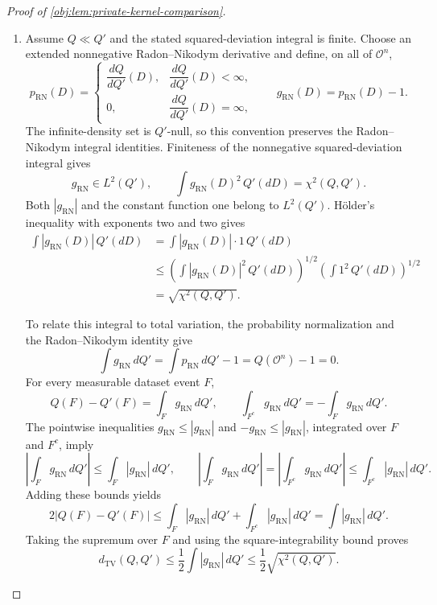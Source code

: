 \documentclass[11pt]{article}
\begin{document}
\begin{proof}[Proof of \cref{obj:lem:private-kernel-comparison}]
\begin{enumerate}
\item Assume \(Q\ll Q'\) and the stated squared-deviation integral is finite. Choose an extended nonnegative Radon--Nikodym derivative and define, on all of \(\mathcal O^n\),
\[
p_{\mathrm{RN}}(D)=
\begin{cases}
\dfrac{dQ}{dQ'}(D),&\dfrac{dQ}{dQ'}(D)<\infty,\\
0,&\dfrac{dQ}{dQ'}(D)=\infty,
\end{cases}
\qquad
g_{\mathrm{RN}}(D)=p_{\mathrm{RN}}(D)-1.
\]
The infinite-density set is \(Q'\)-null, so this convention preserves the Radon--Nikodym integral identities. Finiteness of the nonnegative squared-deviation integral gives
\[
g_{\mathrm{RN}}\in L^2(Q'),
\qquad
\int g_{\mathrm{RN}}(D)^2\,Q'(dD)=\chi^2(Q,Q').
\]
Both \(|g_{\mathrm{RN}}|\) and the constant function one belong to \(L^2(Q')\). Hölder's inequality with exponents two and two gives
\[
\begin{aligned}
\int|g_{\mathrm{RN}}(D)|\,Q'(dD)
&=\int|g_{\mathrm{RN}}(D)|\cdot1\,Q'(dD)\\
&\le
\left(\int|g_{\mathrm{RN}}(D)|^2\,Q'(dD)\right)^{1/2}
\left(\int1^2\,Q'(dD)\right)^{1/2}\\
&=\sqrt{\chi^2(Q,Q')}.
\end{aligned}
\]

To relate this integral to total variation, the probability normalization and the Radon--Nikodym identity give
\[
\int g_{\mathrm{RN}}\,dQ'
=
\int p_{\mathrm{RN}}\,dQ'-1
=Q(\mathcal O^n)-1=0.
\]
For every measurable dataset event \(F\),
\[
Q(F)-Q'(F)=\int_F g_{\mathrm{RN}}\,dQ',
\qquad
\int_{F^c}g_{\mathrm{RN}}\,dQ'
=-\int_F g_{\mathrm{RN}}\,dQ'.
\]
The pointwise inequalities
\(g_{\mathrm{RN}}\le|g_{\mathrm{RN}}|\) and
\(-g_{\mathrm{RN}}\le|g_{\mathrm{RN}}|\), integrated over \(F\) and \(F^c\), imply
\[
\left|\int_F g_{\mathrm{RN}}\,dQ'\right|
\le\int_F|g_{\mathrm{RN}}|\,dQ',
\qquad
\left|\int_F g_{\mathrm{RN}}\,dQ'\right|
=
\left|\int_{F^c}g_{\mathrm{RN}}\,dQ'\right|
\le\int_{F^c}|g_{\mathrm{RN}}|\,dQ'.
\]
Adding these bounds yields
\[
2|Q(F)-Q'(F)|
\le
\int_F|g_{\mathrm{RN}}|\,dQ'
+\int_{F^c}|g_{\mathrm{RN}}|\,dQ'
=
\int|g_{\mathrm{RN}}|\,dQ'.
\]
Taking the supremum over \(F\) and using the square-integrability bound proves
\[
d_{\mathrm{TV}}(Q,Q')
\le\frac12\int|g_{\mathrm{RN}}|\,dQ'
\le\frac12\sqrt{\chi^2(Q,Q')}.
\]
\end{enumerate}
\end{proof}
\end{document}
